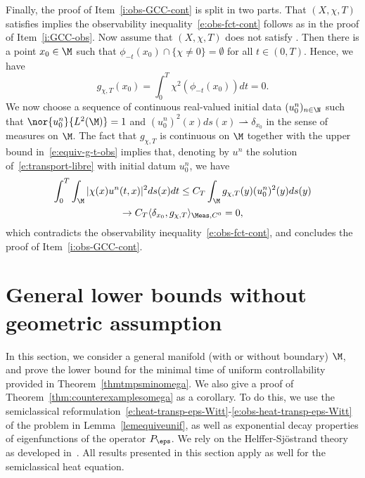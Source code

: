 Finally, the proof of Item~\eqref{i:obs-GCC-cont} is split in two parts. That $(X,\chi,T)$ satisfies \pGCC implies the observability inequality~\eqref{e:obs-fct-cont} follows as in the proof of Item~\eqref{i:GCC-obs}. Now assume that $(X,\chi,T)$ does not satisfy \pGCC. Then there is a point $x_0\in \M$ such that $\phi_{-t}(x_0) \cap \{\chi \neq 0\} = \emptyset$ for all $t\in (0,T)$. Hence, we have
\[
g_{\chi,T}(x_0)= \int_0^T \chi^2 (\phi_{-t}(x_0)) dt =0.
\]
We now choose a sequence of continuous real-valued initial data $(u_0^n)_{n\in \N}$ such that $\nor{u_0^n}{L^2(\M)}=1$ and $(u_0^n)^2(x)ds(x) \rightharpoonup \delta_{x_0}$ in the sense of measures on $\M$. The fact that $g_{\chi,T}$ is continuous on $\M$ together with the upper bound in~\eqref{e:equiv-g-t-obs}
implies that, denoting by $u^n$ the solution of~\eqref{e:transport-libre} with initial datum $u_0^n$, we have
\begin{multline*}
\int_0^T\int_{\M} |\chi(x)u^n(t,x)|^2 ds(x)dt \leq C_T \int_\M g_{\chi,T}(y) (u_0^n)^2(y) ds(y)\\
\to C_T \langle \delta_{x_0}, g_{\chi,T} \rangle_{\Meas, C^0} = 0,
\end{multline*}
which contradicts the observability inequality~\eqref{e:obs-fct-cont}, and concludes the proof of Item~\eqref{i:obs-GCC-cont}.
\enp

\section{General lower bounds without geometric assumption}
\label{s:general-bounds}
In this section, we consider a general manifold (with or without boundary) $\M$, and prove the lower bound for the minimal time of uniform controllability provided in Theorem~\ref{thmtmpsminomega}. We also give a proof of Theorem~\ref{thm:counterexamplesomega} as a corollary.
To do this, we use the semiclassical reformulation~\eqref{e:heat-transp-eps-Witt}-\eqref{e:obs-heat-transp-eps-Witt} of the problem in Lemma~\ref{lemequiveunif}, as well as exponential decay properties of eigenfunctions of the operator $P_\eps$. We rely on the Helffer-Sjöstrand theory as developed in~\cite{HS84,Helffer:booksemiclassic,DS:book}. All results presented in this section apply as well for the semiclassical heat equation.

